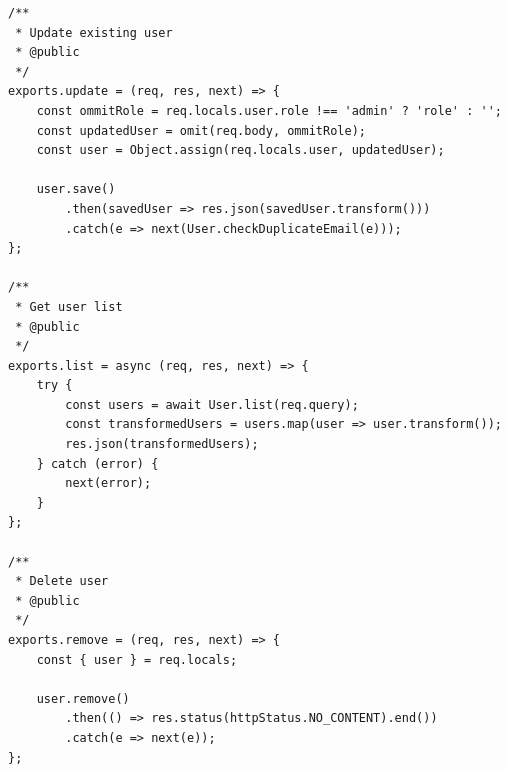 \documentclass[12pt]{article}
\begin{document}
\begin{verbatim}
/**
 * Update existing user
 * @public
 */
exports.update = (req, res, next) => {
    const ommitRole = req.locals.user.role !== 'admin' ? 'role' : '';
    const updatedUser = omit(req.body, ommitRole);
    const user = Object.assign(req.locals.user, updatedUser);

    user.save()
        .then(savedUser => res.json(savedUser.transform()))
        .catch(e => next(User.checkDuplicateEmail(e)));
};

/**
 * Get user list
 * @public
 */
exports.list = async (req, res, next) => {
    try {
        const users = await User.list(req.query);
        const transformedUsers = users.map(user => user.transform());
        res.json(transformedUsers);
    } catch (error) {
        next(error);
    }
};

/**
 * Delete user
 * @public
 */
exports.remove = (req, res, next) => {
    const { user } = req.locals;

    user.remove()
        .then(() => res.status(httpStatus.NO_CONTENT).end())
        .catch(e => next(e));
};

 \end{verbatim}
 
\end{document}
